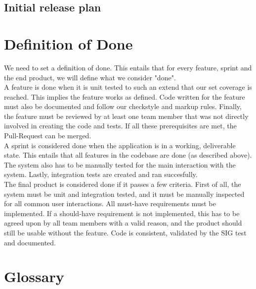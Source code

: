 \section{Initial release plan}


\chapter{Definition of Done}
We need to set a definition of done.
This entails that for every feature, sprint and the end product, we will define what we consider "done".\\

A feature is done when it is unit tested to such an extend that our set coverage is reached. This implies the feature works as defined. Code written for the feature must also be documented and follow our checkstyle and markup rules. Finally, the feature must be reviewed by at least one team member that was not directly involved in creating the code and tests. If all these prerequisites are met, the Pull-Request can be merged.\\

A sprint is considered done when the application is in a working, deliverable state. This entails that all features in the codebase are done (as described above). The system also has to be manually tested for the main interaction with the system. Lastly, integration tests are created and ran succesfully.\\

The final product is considered done if it passes a few criteria. First of all, the system must be unit and integration tested, and it must be manually inspected for all common user interactions. All must-have requirements must be implemented. If a should-have requirement is not implemented, this has to be agreed upon by all team members with a valid reason, and the product should still be usable without the feature. Code is consistent, validated by the SIG test and documented.

\chapter{Glossary}